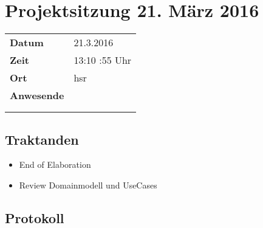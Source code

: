\documentclass[class=scrbook,crop=false]{standalone}
\begin{document}
	
	\section{Projektsitzung 21. März 2016}
	
	\begin{tabular}{ll}
		\textbf{Datum} & 21.3.2016 \\
		\textbf{Zeit} & 13:10 \textendash 13:55 Uhr \\
		\textbf{Ort} & \acs{hsr} \\
		\textbf{Anwesende} & \proff \\ & \ubos \\ & \pchr
	\end{tabular}
	
	\subsection*{Traktanden}
	
	\begin{itemize}
		\item End of Elaboration
        \item Review Domainmodell und UseCases
	\end{itemize}
	
	\subsection*{Protokoll}
\end{document}
